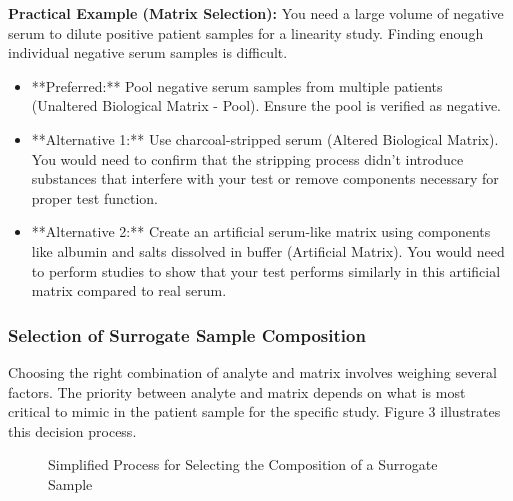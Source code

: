 \documentclass{article}
\begin{document}
\textbf{Practical Example (Matrix Selection):}
You need a large volume of negative serum to dilute positive patient samples for a linearity study. Finding enough individual negative serum samples is difficult.
\begin{itemize}
    \item **Preferred:** Pool negative serum samples from multiple patients (Unaltered Biological Matrix - Pool). Ensure the pool is verified as negative.
    \item **Alternative 1:** Use charcoal-stripped serum (Altered Biological Matrix). You would need to confirm that the stripping process didn't introduce substances that interfere with your test or remove components necessary for proper test function.
    \item **Alternative 2:** Create an artificial serum-like matrix using components like albumin and salts dissolved in buffer (Artificial Matrix). You would need to perform studies to show that your test performs similarly in this artificial matrix compared to real serum.
\end{itemize}

\subsubsection{Selection of Surrogate Sample Composition}

Choosing the right combination of analyte and matrix involves weighing several factors. The priority between analyte and matrix depends on what is most critical to mimic in the patient sample for the specific study. Figure 3 illustrates this decision process.

\begin{figure}[h!]
    \centering
    \caption{Simplified Process for Selecting the Composition of a Surrogate Sample \cite{CLSIEP39Ed1E}}
\end{figure}
\end{document}
